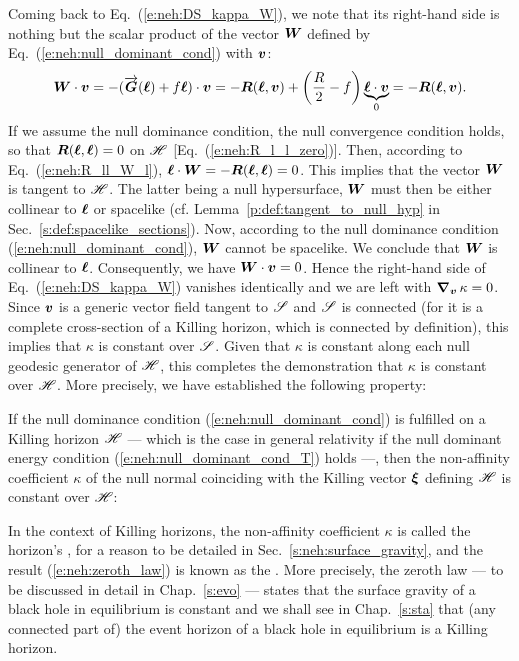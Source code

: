 Coming back to Eq.~(\ref{e:neh:DS_kappa_W}), we note that its right-hand side
is nothing but the scalar product of the vector $\bm{W}$
defined by Eq.~(\ref{e:neh:null_dominant_cond}) with $\bm{v}$:
\[
    \bm{W}\cdot\bm{v} = - (\overrightarrow{\bm{G}}(\bm{\ell}) + f \bm{\ell})\cdot\bm{v}
    = - \bm{R}(\bm{\ell}, \bm{v}) + \left( \frac{R}{2} - f \right) \underbrace{\bm{\ell}\cdot\bm{v}}_{0}
    = - \bm{R}(\bm{\ell}, \bm{v}) .
\]
If we assume the null dominance condition, the null convergence condition
holds, so that $\bm{R}(\bm{\ell}, \bm{\ell}) = 0$ on $\mathscr{H}$ [Eq.~(\ref{e:neh:R_l_l_zero})].
Then, according to Eq.~(\ref{e:neh:R_ll_W_l}),
$\bm{\ell} \cdot \bm{W} = - \bm{R}(\bm{\ell}, \bm{\ell}) = 0$.
This implies that the vector $\bm{W}$ is tangent to $\mathscr{H}$. The latter
being a null hypersurface, $\bm{W}$ must then be
either collinear to $\bm{\ell}$ or spacelike (cf. Lemma~\ref{p:def:tangent_to_null_hyp} in Sec.~\ref{s:def:spacelike_sections}).
Now, according to the null dominance condition (\ref{e:neh:null_dominant_cond}),
$\bm{W}$ cannot be
spacelike. We conclude that $\bm{W}$ is collinear to $\bm{\ell}$. Consequently,
we have $\bm{W}\cdot\bm{v} = 0$.
Hence the right-hand side of Eq.~(\ref{e:neh:DS_kappa_W}) vanishes identically
and we are left with $\bm{\nabla}_{\bm{v}} \, \kappa = 0$. Since $\bm{v}$ is a generic
vector field tangent to $\mathscr{S}$ and $\mathscr{S}$ is connected (for it is a complete cross-section
of a Killing horizon, which is connected by definition),
this implies that
$\kappa$ is constant over $\mathscr{S}$. Given that $\kappa$ is
constant along each null geodesic generator of $\mathscr{H}$, this completes the demonstration
that $\kappa$ is constant over $\mathscr{H}$. More precisely, we have established
the following property:

\begin{prop}
\label{p:neh:zeroth_law}
If the null dominance condition
(\ref{e:neh:null_dominant_cond})
is fulfilled on a Killing horizon $\mathscr{H}$ --- which is the case in general relativity
if the null dominant energy condition (\ref{e:neh:null_dominant_cond_T}) holds ---, then the non-affinity coefficient $\kappa$
of the null normal coinciding with the Killing vector $\bm{\xi}$ defining $\mathscr{H}$
is constant over $\mathscr{H}$:
\be \label{e:neh:zeroth_law}
\ee
\end{prop}
In the context of Killing horizons, the non-affinity coefficient $\kappa$ is
called the horizon's ,
for a reason to be detailed in Sec.~\ref{s:neh:surface_gravity},
and the result
(\ref{e:neh:zeroth_law}) is known as the
. More precisely,
the zeroth law --- to be discussed in detail in Chap.~\ref{s:evo} ---
states that the surface gravity of a black hole in equilibrium is
constant and we shall see in Chap.~\ref{s:sta} that (any connected part of)
the event horizon of a black hole in equilibrium is a Killing horizon.


